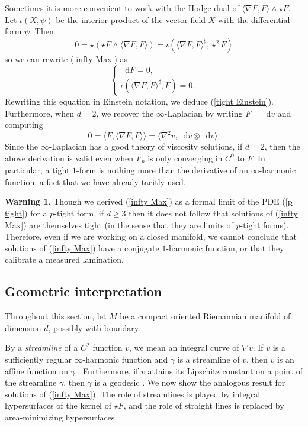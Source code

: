 \documentclass[reqno,11pt]{amsart}
\newcommand*\dif{\mathop{}\!\mathrm{d}}
\newcommand{\dfn}[1]{\emph{#1}\index{#1}}
\theoremstyle{definition}
\newtheorem{warning}[theorem]{Warning}
\numberwithin{equation}{section}
\begin{document}
Sometimes it is more convenient to work with the Hodge dual of $\langle \nabla F, F\rangle \wedge \star F$.
Let $\iota(X, \psi)$ be the interior product of the vector field $X$ with the differential form $\psi$.
Then 
$$0 = \star(\star F \wedge \langle \nabla F, F\rangle) = \iota(\langle \nabla F, F\rangle^\sharp, \star^2 F)$$
so we can rewrite (\ref{infty Max}) as
\begin{equation}\label{dual infty Max}
\begin{cases}
\dif F = 0, \\
\iota(\langle \nabla F, F\rangle^\sharp, F) = 0.
\end{cases}
\end{equation}
Rewriting this equation in Einstein notation, we deduce (\ref{tight Einstein}).
Furthermore, when $d = 2$, we recover the $\infty$-Laplacian by writing $F = \dif v$ and computing 
$$0 = \langle F, \langle \nabla F, F\rangle\rangle = \langle \nabla^2 v, \dif v \otimes \dif v\rangle.$$
Since the $\infty$-Laplacian has a good theory of viscosity solutions, if $d = 2$, then the above derivation is valid even when $F_p$ is only converging in $C^0$ to $F$.
In particular, a tight $1$-form is nothing more than the derivative of an $\infty$-harmonic function, a fact that we have already tacitly used.

\begin{warning}
Though we derived (\ref{infty Max}) as a formal limit of the PDE (\ref{p tight}) for a $p$-tight form, if $d \geq 3$ then it does not follow that solutions of (\ref{infty Max}) are themselves tight (in the sense that they are limits of $p$-tight forms).
Therefore, even if we are working on a closed manifold, we cannot conclude that solutions of (\ref{infty Max}) have a conjugate $1$-harmonic function, or that they calibrate a measured lamination.
\end{warning}

\subsection{Geometric interpretation}\label{EL interpretation}
Throughout this section, let $M$ be a compact oriented Riemannian manifold of dimension $d$, possibly with boundary.

By a \dfn{streamline} of a $C^2$ function $v$, we mean an integral curve of $\nabla v$.
If $v$ is a sufficiently regular $\infty$-harmonic function and $\gamma$ is a streamline of $v$, then $v$ is an affine function on $\gamma$ \cite[\S3]{Aronsson67}.
Furthermore, if $v$ attains its Lipschitz constant on a point of the streamline $\gamma$, then $\gamma$ is a geodesic \cite[Theorem 5.2]{daskalopoulos2020transverse}.
We now show the analogous result for solutions of (\ref{infty Max}).
The role of streamlines is played by integral hypersurfaces of the kernel of $\star F$, and the role of straight lines is replaced by area-minimizing hypersurfaces.
\end{document}

